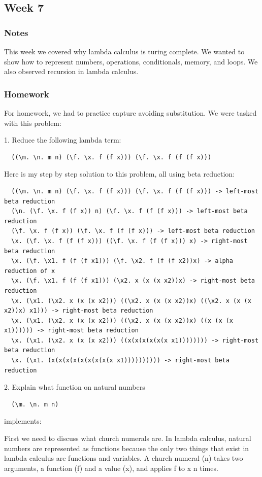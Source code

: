 \documentclass{article}
\theoremstyle{theorem}
\theoremstyle{definition}
\theoremstyle{remark}
\begin{document}
\subsection{Week 7}
\subsubsection*{Notes}
This week we covered why lambda calculus is turing complete. We wanted to show how to represent
numbers, operations, conditionals, memory, and loops. We also observed recursion in lambda calculus.

\subsubsection*{Homework}
For homework, we had to practice capture avoiding substitution. We were tasked with this problem:

1. Reduce the following lambda term:
\begin{lstlisting}
  ((\m. \n. m n) (\f. \x. f (f x))) (\f. \x. f (f (f x))) 
\end{lstlisting}
Here is my step by step solution to this problem, all using beta reduction:
\begin{lstlisting}
  ((\m. \n. m n) (\f. \x. f (f x))) (\f. \x. f (f (f x))) -> left-most beta reduction
  (\n. (\f. \x. f (f x)) n) (\f. \x. f (f (f x))) -> left-most beta reduction
  (\f. \x. f (f x)) (\f. \x. f (f (f x))) -> left-most beta reduction
  \x. (\f. \x. f (f (f x))) ((\f. \x. f (f (f x))) x) -> right-most beta reduction
  \x. (\f. \x1. f (f (f x1))) (\f. \x2. f (f (f x2))x) -> alpha reduction of x
  \x. (\f. \x1. f (f (f x1))) (\x2. x (x (x x2))x) -> right-most beta reduction
  \x. (\x1. (\x2. x (x (x x2))) ((\x2. x (x (x x2))x) ((\x2. x (x (x x2))x) x1))) -> right-most beta reduction
  \x. (\x1. (\x2. x (x (x x2))) ((\x2. x (x (x x2))x) ((x (x (x x1)))))) -> right-most beta reduction
  \x. (\x1. (\x2. x (x (x x2))) ((x(x(x(x(x(x x1)))))))) -> right-most beta reduction
  \x. (\x1. (x(x(x(x(x(x(x(x(x x1)))))))))) -> right-most beta reduction
\end{lstlisting}
2. Explain what function on natural numbers
\begin{lstlisting}
  (\m. \n. m n)
\end{lstlisting}
implements:

First we need to discuss what church numerals are. In lambda calculus, 
natural numbers are represented as functions because the only two things
that exist in lambda calculus are functions and variables. A church numeral (n)
takes two arguments, a function (f) and a value (x), and applies f to x n times.
\end{document}
